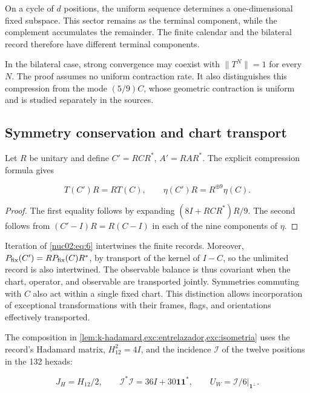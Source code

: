 \begin{corollary}
On a cycle of \(d\) positions, the uniform sequence determines a one-dimensional fixed subspace. This sector remains as the terminal component, while the complement accumulates the remainder. The finite calendar and the bilateral record therefore have different terminal components.
\end{corollary}

In the bilateral case, strong convergence may coexist with \(\|T^N\|=1\) for every \(N\). The proof assumes no uniform contraction rate. It also distinguishes this compression from the mode \((5/9)C\), whose geometric contraction is uniform and is studied separately in the sources.

\subsection{Symmetry conservation and chart transport}

Let \(R\) be unitary and define \(C'=RCR^*\), \(A'=RAR^*\). The explicit compression formula gives

\begin{equation}
T(C')R=RT(C),\qquad
\eta(C')R=R^{\oplus9}\eta(C).\label{nuc02:eq:6}
\end{equation}

\begin{proof}
The first equality follows by expanding \((8I+RCR^*)R/9\). The second follows from \((C'-I)R=R(C-I)\) in each of the nine components of \(\eta\).
\end{proof}

Iteration of \eqref{nuc02:eq:6} intertwines the finite records. Moreover, \(P_{\rm fix}(C')=RP_{\rm fix}(C)R^*\), by transport of the kernel of \(I-C\), so the unlimited record is also intertwined. The observable balance is thus covariant when the chart, operator, and observable are transported jointly. Symmetries commuting with \(C\) also act within a single fixed chart. This distinction allows incorporation of exceptional transformations with their frames, flags, and orientations effectively transported.

The composition in \cref{lem:k-hadamard,exc:entrelazador,exc:isometria} uses the record's Hadamard matrix, \(H_{12}^2=4I\), and the incidence \(\mathcal I\) of the twelve positions in the 132 hexads:

\[
J_H=H_{12}/2,\qquad
\mathcal I^*\mathcal I=36I+30\mathbf1\mathbf1^*,\qquad
U_W=\mathcal I/6\big|_{\mathbf1^\perp}.
\]

